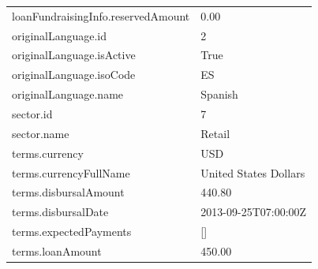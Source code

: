 \begin{longtable}{|p{}|p{}|}
	loanFundraisingInfo.reservedAmount              & 0.00                                                                                                          \\
	originalLanguage.id                             & 2                                                                                                             \\
	originalLanguage.isActive                       & True                                                                                                          \\
	originalLanguage.isoCode                        & ES                                                                                                            \\
	originalLanguage.name                           & Spanish                                                                                                       \\
	sector.id                                       & 7                                                                                                             \\
	sector.name                                     & Retail                                                                                                        \\
	terms.currency                                  & USD                                                                                                           \\
	terms.currencyFullName                          & United States Dollars                                                                                         \\
	terms.disbursalAmount                           & 440.80                                                                                                        \\
	terms.disbursalDate                             & 2013-09-25T07:00:00Z                                                                                          \\
	terms.expectedPayments                          & {[}{]}                                                                                                        \\
	terms.loanAmount                                & 450.00                                                                                                        \\

\end{longtable}

